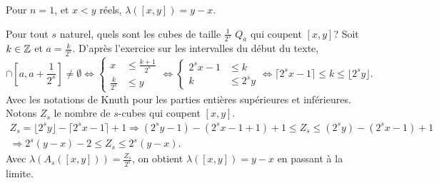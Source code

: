 \begin{propn}
  Pour $n=1$, et $x < y$ réels, $\lambda([x,y]) = y - x$.
\end{propn}
 \begin{demo}
  Pour tout $s$ naturel, quels sont les cubes de taille $\frac{1}{2^s}$ $Q_a$ qui coupent $[x,y]$?\newline
  Soit $k\in \mathbb{Z}$ et $a=\frac{k}{2^s}$. D'après l'exercice sur les intervalles du début du texte,
  \begin{displaymath}
    [x,y] \cap [a, a+\frac{1}{2^s}] \neq \emptyset
    \Leftrightarrow
    \left\lbrace
    \begin{aligned}
       x &\leq \frac{k + 1}{2^s} \\
       \frac{k}{2^s} &\leq y
    \end{aligned}
    \right.
    \Leftrightarrow
    \left\lbrace
    \begin{aligned}
       2^s x -1 &\leq k \\
       k &\leq 2^s y
    \end{aligned}
    \right.
    \Leftrightarrow
    \lceil 2^s x -1 \rceil \leq k \leq \lfloor 2^s y \rfloor .
  \end{displaymath}
Avec les notations de Knuth pour les parties entières supérieures et inférieures. Notons $Z_s$ le nombre de $s$-cubes qui coupent $[x,y]$.
\begin{multline*}
 Z_s = \lfloor 2^s y \rfloor - \lceil 2^s x -1 \rceil + 1 \Rightarrow
 (2^s y-1) - (2^s x -1+1) + 1\leq Z_s \leq (2^s y) - (2^s x -1) + 1 \\
 \Rightarrow
 2^s(y-x) - 2 \leq Z_s \leq 2^s(y-x).
\end{multline*}
Avec $\lambda(A_s([x,y])) = \frac{Z_s}{2^s}$, on obtient $\lambda([x,y])= y-x$ en passant à la limite.
\end{demo}


